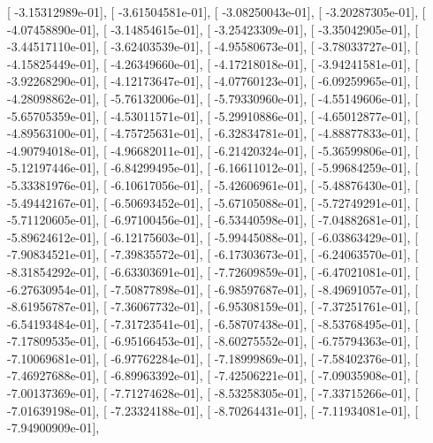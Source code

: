 \documentclass{article}
\begin{document}
       [ -3.15312989e-01],
       [ -3.61504581e-01],
       [ -3.08250043e-01],
       [ -3.20287305e-01],
       [ -4.07458890e-01],
       [ -3.14854615e-01],
       [ -3.25423309e-01],
       [ -3.35042905e-01],
       [ -3.44517110e-01],
       [ -3.62403539e-01],
       [ -4.95580673e-01],
       [ -3.78033727e-01],
       [ -4.15825449e-01],
       [ -4.26349660e-01],
       [ -4.17218018e-01],
       [ -3.94241581e-01],
       [ -3.92268290e-01],
       [ -4.12173647e-01],
       [ -4.07760123e-01],
       [ -6.09259965e-01],
       [ -4.28098862e-01],
       [ -5.76132006e-01],
       [ -5.79330960e-01],
       [ -4.55149606e-01],
       [ -5.65705359e-01],
       [ -4.53011571e-01],
       [ -5.29910886e-01],
       [ -4.65012877e-01],
       [ -4.89563100e-01],
       [ -4.75725631e-01],
       [ -6.32834781e-01],
       [ -4.88877833e-01],
       [ -4.90794018e-01],
       [ -4.96682011e-01],
       [ -6.21420324e-01],
       [ -5.36599806e-01],
       [ -5.12197446e-01],
       [ -6.84299495e-01],
       [ -6.16611012e-01],
       [ -5.99684259e-01],
       [ -5.33381976e-01],
       [ -6.10617056e-01],
       [ -5.42606961e-01],
       [ -5.48876430e-01],
       [ -5.49442167e-01],
       [ -6.50693452e-01],
       [ -5.67105088e-01],
       [ -5.72749291e-01],
       [ -5.71120605e-01],
       [ -6.97100456e-01],
       [ -6.53440598e-01],
       [ -7.04882681e-01],
       [ -5.89624612e-01],
       [ -6.12175603e-01],
       [ -5.99445088e-01],
       [ -6.03863429e-01],
       [ -7.90834521e-01],
       [ -7.39835572e-01],
       [ -6.17303673e-01],
       [ -6.24063570e-01],
       [ -8.31854292e-01],
       [ -6.63303691e-01],
       [ -7.72609859e-01],
       [ -6.47021081e-01],
       [ -6.27630954e-01],
       [ -7.50877898e-01],
       [ -6.98597687e-01],
       [ -8.49691057e-01],
       [ -8.61956787e-01],
       [ -7.36067732e-01],
       [ -6.95308159e-01],
       [ -7.37251761e-01],
       [ -6.54193484e-01],
       [ -7.31723541e-01],
       [ -6.58707438e-01],
       [ -8.53768495e-01],
       [ -7.17809535e-01],
       [ -6.95166453e-01],
       [ -8.60275552e-01],
       [ -6.75794363e-01],
       [ -7.10069681e-01],
       [ -6.97762284e-01],
       [ -7.18999869e-01],
       [ -7.58402376e-01],
       [ -7.46927688e-01],
       [ -6.89963392e-01],
       [ -7.42506221e-01],
       [ -7.09035908e-01],
       [ -7.00137369e-01],
       [ -7.71274628e-01],
       [ -8.53258305e-01],
       [ -7.33715266e-01],
       [ -7.01639198e-01],
       [ -7.23324188e-01],
       [ -8.70264431e-01],
       [ -7.11934081e-01],
       [ -7.94900909e-01],
\end{document}
